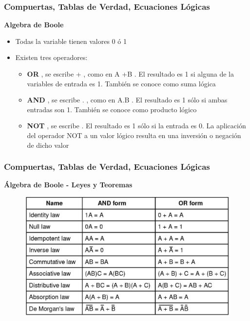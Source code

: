 \documentclass[aspectratio=169,compress]{beamer}
\begin{document}
\begin{footnotesize}
\begin{frame}
\frametitle{Compuertas, Tablas de Verdad, Ecuaciones Lógicas}
\begin{center}\textbf{Algebra de Boole}\end{center}
\begin{itemize}
\item Todas la variable tienen valores 0 ó 1
\item Existen tres operadores:
\begin{itemize}
\item \textbf{OR}
, se escribe 
+
, como en 
A +B
. El resultado es 1 si alguna 
de la variables de entrada es 1. También se conoce como 
suma lógica
\item \textbf{AND}
, se escribe
 .
, como en
 A.B
. El resultado es 1 sólo si 
ambas entradas son 1. También se conoce como 
producto 
lógico
\item \textbf{NOT}
, se escribe      . El resultado es 1 sólo si la entrada es 0. 
La aplicación del operador NOT a un valor lógico resulta en 
una inversión o negación de dicho valor 
\end{itemize}
\end{itemize}
\end{frame}






\begin{frame}
\frametitle{Compuertas, Tablas de Verdad, Ecuaciones Lógicas}
\begin{center}\textbf{Álgebra de Boole - Leyes y Teoremas}\end{center}
\begin{figure}
\includegraphics[scale=0.2]{images/leyes.jpg} 
\end{figure}
\end{frame}








\end{footnotesize}
\end{document}
